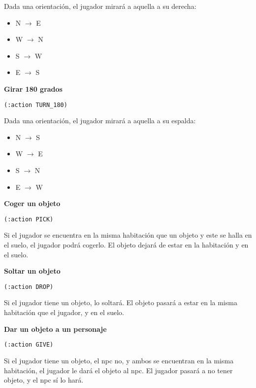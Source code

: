 \documentclass[11pt,a4paper]{article}
\begin{document}
Dada una orientación, el jugador mirará a aquella a su derecha:

\begin{itemize}
\item N $\rightarrow$ E
\item W $\rightarrow$ N
\item S $\rightarrow$ W
\item E $\rightarrow$ S
\end{itemize}

\medskip

\large{\textbf{Girar 180 grados}}

\texttt{(:action TURN\_180)}

\smallskip

Dada una orientación, el jugador mirará a aquella a su espalda:

\begin{itemize}
\item N $\rightarrow$ S
\item W $\rightarrow$ E
\item S $\rightarrow$ N
\item E $\rightarrow$ W
\end{itemize}

\medskip

\large{\textbf{Coger un objeto}}

\texttt{(:action PICK)}

\smallskip

Si el jugador se encuentra en la misma habitación que un objeto y este se halla en el suelo,
el jugador podrá cogerlo. El objeto dejará de estar en la habitación y en el suelo.

\medskip

\large{\textbf{Soltar un objeto}}

\texttt{(:action DROP)}

\smallskip

Si el jugador tiene un objeto, lo soltará. El objeto pasará a estar en la misma habitación que el jugador,
y en el suelo.

\medskip

\large{\textbf{Dar un objeto a un personaje}}

\texttt{(:action GIVE)}

\smallskip

Si el jugador tiene un objeto, el npc no, y ambos se encuentran en la misma habitación, el jugador le dará 
el objeto al npc. El jugador pasará a no tener objeto, y el npc sí lo hará. 
\end{document}
